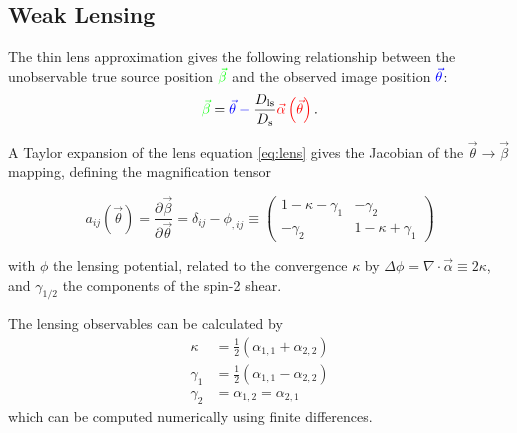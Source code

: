 \documentclass{beamer}
\begin{document}
  \subsection{Weak Lensing}

  \begin{frame}
    The thin lens approximation gives the following relationship between the unobservable true source position $\color{green}{\vec{\beta}}$ and the observed image position $\color{blue}{\vec{\theta}}$:
    \begin{equation} \label{eq:lens}
      \color{green}{\vec{\beta}} \color{black}= \color{blue}{\vec{\theta}} - \color{black}{\frac{D_{\text{ls}}}{D_{\text{s}}}}\color{red}{\vec{\alpha}}\left( \vec{\theta} \right)\color{black}.
    \end{equation}
  \end{frame}

  \begin{frame}
    A Taylor expansion of the lens equation \ref{eq:lens} gives the Jacobian of the $\vec{\theta} \rightarrow \vec{\beta}$ mapping, defining the magnification tensor

    \begin{equation} \label{eq:mu tensor}
      a_{ij}\left( \vec{\theta} \right) = \frac{\partial\vec{\beta}}{\partial\vec{\theta}} = \delta_{ij} - \phi_{,ij} \equiv
      \begin{pmatrix}
        1 - \kappa - \gamma_1 & -\gamma_2 \\
        -\gamma_2 & 1 - \kappa + \gamma_1
      \end{pmatrix}
    \end{equation}

    with $\phi$ the lensing potential, related to the convergence $\kappa$ by $\Delta \phi = \nabla \cdot \vec{\alpha} \equiv 2\kappa$, and $\gamma_{1/2}$ the components of the spin-2 shear.
  \end{frame}

  \begin{frame}
    The lensing observables can be calculated by
    \begin{align} \label{eq:lensing observables}
      \kappa &= \frac{1}{2}\left( \alpha_{1,1} + \alpha_{2,2} \right) \\
      \gamma_1 &= \frac{1}{2}\left( \alpha_{1,1} - \alpha_{2,2} \right) \\
      \gamma_2 &= \alpha_{1,2} = \alpha_{2,1}
    \end{align}
    which can be computed numerically using finite differences.
  \end{frame}
\end{document}
